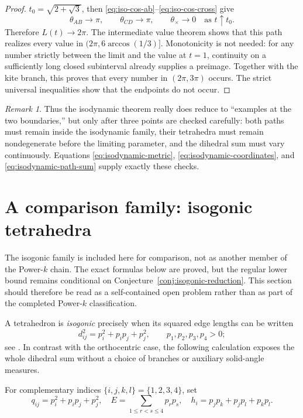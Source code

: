 \documentclass[11pt,a4paper]{article}
\theoremstyle{definition}
\theoremstyle{remark}
\newtheorem{remark}[theorem]{Remark}
\begin{document}
\begin{proof}
$t_0=\sqrt{2+\sqrt3}$, then \eqref{eq:iso-cos-ab}--\eqref{eq:iso-cos-cross}
give
\[
 \theta_{AB}\longrightarrow\pi,\qquad
 \theta_{CD}\longrightarrow\pi,\qquad
 \theta_{\times}\longrightarrow0
 \quad\text{as }t\uparrow t_0.
\]
Therefore $L(t)\to2\pi$.  The intermediate value theorem shows that this
path realizes every value in
$(2\pi,6\arccos(1/3)]$.  Monotonicity is not needed: for any number strictly
between the limit and the value at $t=1$, continuity on a sufficiently long
closed subinterval already supplies a preimage.  Together with the kite
branch, this proves that every number in $(2\pi,3\pi)$ occurs.  The strict
universal inequalities show that the endpoints do not occur.
\end{proof}

\begin{remark}
Thus the isodynamic theorem really does reduce to ``examples at the two
boundaries,'' but only after three points are checked carefully: both paths
must remain inside the isodynamic family, their tetrahedra must remain
nondegenerate before the limiting parameter, and the dihedral sum must vary
continuously.  Equations \eqref{eq:isodynamic-metric},
\eqref{eq:isodynamic-coordinates}, and \eqref{eq:isodynamic-path-sum} supply
exactly these checks.
\end{remark}

\section{A comparison family: isogonic tetrahedra}
\label{sec:isogonic}

The isogonic family is included here for comparison, not as another member of
the Power-$k$ chain.  The exact formulas below are proved, but the regular
lower bound remains conditional on Conjecture~\ref{conj:isogonic-reduction}.
This section should therefore be read as a self-contained open problem rather
than as part of the completed Power-$k$ classification.

A tetrahedron is \emph{isogonic} precisely when its squared edge lengths can
be written
\begin{equation}\label{eq:isogonic-metric}
 d_{ij}^2=p_i^2+p_i p_j+p_j^2,
 \qquad p_1,p_2,p_3,p_4>0;
\end{equation}
see \cite[Theorem~4]{HajjaHammoudeh2014}.  In contrast with the
orthocentric case, the following calculation exposes the whole dihedral sum
without a choice of branches or auxiliary solid-angle measures.

For complementary indices $\{i,j,k,l\}=\{1,2,3,4\}$, set
\begin{equation}\label{eq:isogonic-notation}
 q_{ij}=p_i^2+p_i p_j+p_j^2,
 \quad
 E=\sum_{1\leq r<s\leq4}p_rp_s,
 \quad
 h_i=p_jp_k+p_jp_l+p_kp_l.
\end{equation}
\end{document}
